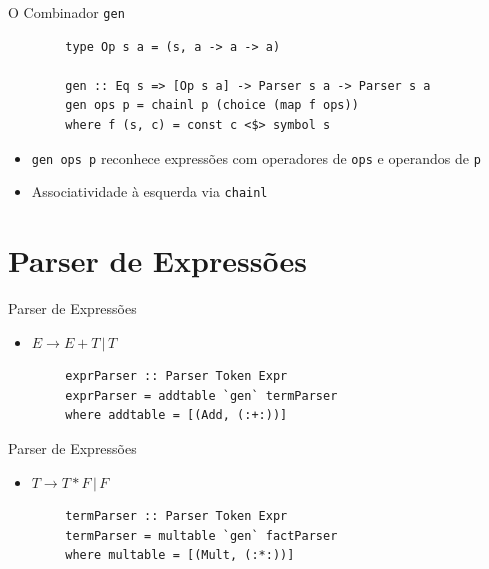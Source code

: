 \begin{frame}[fragile]{O Combinador \texttt{gen}}

    \begin{lstlisting}
        type Op s a = (s, a -> a -> a)

        gen :: Eq s => [Op s a] -> Parser s a -> Parser s a
        gen ops p = chainl p (choice (map f ops))
        where f (s, c) = const c <$> symbol s
    \end{lstlisting}

    \begin{itemize}

        \item
        \texttt{gen ops p} reconhece expressões com
        operadores de \texttt{ops} e operandos de
        \texttt{p}
        \item
        Associatividade à esquerda via \texttt{chainl}
    \end{itemize}
\end{frame}


\section{Parser de Expressões}\label{parser-de-expressuxf5es-1}

\begin{frame}[fragile]{Parser de Expressões}

    \begin{itemize}

        \item
        \(E \to E + T \,|\, T\)
    \end{itemize}

    \begin{lstlisting}
        exprParser :: Parser Token Expr
        exprParser = addtable `gen` termParser
        where addtable = [(Add, (:+:))]
    \end{lstlisting}
\end{frame}

\begin{frame}[fragile]{Parser de Expressões}

    \begin{itemize}

        \item
        \(T \to T * F \,|\, F\)
    \end{itemize}

    \begin{lstlisting}
        termParser :: Parser Token Expr
        termParser = multable `gen` factParser
        where multable = [(Mult, (:*:))]
    \end{lstlisting}
\end{frame}

